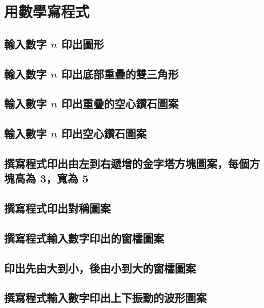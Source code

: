 \chapter{用數學寫程式}

\section{輸入數字 $n$ 印出圖形}


\section{輸入數字 $n$ 印出底部重疊的雙三角形}


\section{輸入數字 $n$ 印出重疊的空心鑽石圖案}


\section{輸入數字 $n$ 印出空心鑽石圖案}


\section{撰寫程式印出由左到右遞增的金字塔方塊圖案，每個方塊高為 3，寬為 5}


\section{撰寫程式印出對稱圖案}


\section{撰寫程式輸入數字印出的窗櫺圖案}


\section{印出先由大到小，後由小到大的窗櫺圖案}


\section{撰寫程式輸入數字印出上下振動的波形圖案}


